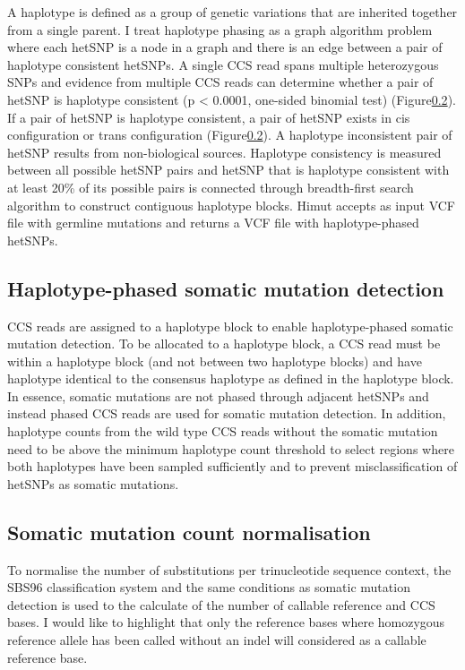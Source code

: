 A haplotype is defined as a group of genetic variations that are inherited together from a single parent. I treat haplotype phasing as a graph algorithm problem where each hetSNP is a node in a graph and there is an edge between a pair of haplotype consistent hetSNPs. A single CCS read spans multiple heterozygous SNPs and evidence from multiple CCS reads can determine whether a pair of hetSNP is haplotype consistent (p < 0.0001, one-sided binomial test) (Figure\ref{}). If a pair of hetSNP is haplotype consistent, a pair of hetSNP exists in cis configuration or trans configuration (Figure\ref{}). A haplotype inconsistent pair of hetSNP results from non-biological sources. Haplotype consistency is measured between all possible hetSNP pairs and hetSNP that is haplotype consistent with at least 20\% of its possible pairs is connected through breadth-first search algorithm to construct contiguous haplotype blocks. Himut accepts as input VCF file with germline mutations and returns a VCF file with haplotype-phased hetSNPs.

\subsection{Haplotype-phased somatic mutation detection}

CCS reads are assigned to a haplotype block to enable haplotype-phased somatic mutation detection. To be allocated to a haplotype block, a CCS read must be within a haplotype block (and not between two haplotype blocks) and have haplotype identical to the consensus haplotype as defined in the haplotype block. In essence, somatic mutations are not phased through adjacent hetSNPs and instead phased CCS reads are used for somatic mutation detection. In addition, haplotype counts from the wild type CCS reads without the somatic mutation need to be above the minimum haplotype count threshold to select regions where both haplotypes have been sampled sufficiently and to prevent misclassification of hetSNPs as somatic mutations.
 
\subsection{Somatic mutation count normalisation}

To normalise the number of substitutions per trinucleotide sequence context, the SBS96 classification system and the same conditions as somatic mutation detection is used to the calculate of the number of callable reference and CCS bases. I would like to highlight that only the reference bases where homozygous reference allele has been called without an indel will considered as a callable reference base. 

